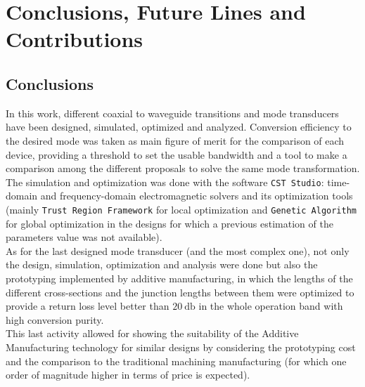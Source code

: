 \documentclass[english,twoside]{article}
\begin{document}
	\newpage
	\section{Conclusions, Future Lines and Contributions}
		\subsection{Conclusions}
		In this work, different coaxial to waveguide transitions and mode transducers have been designed, simulated, optimized and analyzed. Conversion efficiency to the desired mode was taken as main figure of merit for the comparison of each device, providing a threshold to set the usable bandwidth and a tool to make a comparison among the different proposals to solve the same mode transformation. The simulation and optimization was done with the software \texttt{CST Studio}: time-domain and frequency-domain electromagnetic solvers and its optimization tools (mainly \texttt{Trust Region Framework} for local optimization and \texttt{Genetic Algorithm} for global optimization in the designs for which a previous estimation of the parameters value was not available).\\
		
		As for the last designed mode transducer (and the most complex one), not only the design, simulation, optimization and analysis were done but also the prototyping implemented by additive manufacturing, in which the lengths of the different cross-sections and the junction lengths between them were optimized to provide a return loss level better than $\SI{20}{\decibel}$ in the whole operation band with high conversion purity.\\
		
		This last activity allowed for showing the suitability of the Additive Manufacturing technology for similar designs by considering the prototyping cost and the comparison to the traditional machining manufacturing (for which one order of magnitude higher in terms of price is expected).\\				
\end{document}
